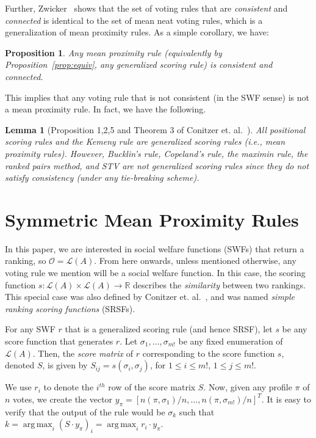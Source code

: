 \documentclass[10pt,letterpaper]{article}
\newcommand{\calL}{{\mathcal{L}}}
\newcommand{\rank}{{\calL(A)}}
\newcommand{\calO}{{\mathcal{O}}}
\DeclareMathOperator*{\argmax}{arg\,max}
\newtheorem{lemma}{Lemma}
\newtheorem{proposition}{Proposition}
\newenvironment{definition}[1][Definition]{\begin{trivlist}
\item[\hskip \labelsep {\bfseries #1}]}{\end{trivlist}}
\begin{document}
Further, Zwicker~\cite{Zwicker08b} shows that the set of voting rules that are \emph{consistent} and \emph{connected} is identical to the set of mean neat voting rules, which is a generalization of mean proximity rules. As a simple corollary, we have: 

\begin{proposition}
Any mean proximity rule (equivalently by Proposition~\ref{prop:equiv}, any generalized scoring rule) is consistent and connected.
\end{proposition}

This implies that any voting rule that is not consistent (in the SWF sense) is not a mean proximity rule. In fact, we have the following.

\begin{lemma}[Proposition 1,2,5 and Theorem 3 of Conitzer et. al.~\cite{CRX09}]
All positional scoring rules and the Kemeny rule are generalized scoring rules (i.e., mean proximity rules). However, Bucklin's rule, Copeland's rule, the maximin rule, the ranked pairs method, and STV are not generalized scoring rules since they do not satisfy consistency (under any tie-breaking scheme). 
\end{lemma}

\section{Symmetric Mean Proximity Rules}

In this paper, we are interested in social welfare functions (SWFs) that return a ranking, so $\calO = \rank$. From here onwards, unless mentioned otherwise, any voting rule we mention will be a social welfare function. In this case, the scoring function $s : \rank \times \rank \rightarrow \mathbb{R}$ describes the \emph{similarity} between two rankings. This special case was also defined by Conitzer et. al.~\cite{CRX09}, and was named \emph{simple ranking scoring functions} (SRSFs). 

\begin{definition}[Score Matrix]
For any SWF $r$ that is a generalized scoring rule (and hence SRSF), let $s$ be any score function that generates $r$. Let $\sigma_1,\ldots,\sigma_{m!}$ be any fixed enumeration of $\rank$. Then, the \emph{score matrix} of $r$ corresponding to the score function $s$, denoted $S$, is given by $S_{ij} = s(\sigma_i,\sigma_j)$, for $1 \le i \le m!$, $1 \le j \le m!$. 
\end{definition}

We use $r_i$ to denote the $i^{th}$ row of the score matrix $S$. Now, given any profile $\pi$ of $n$ votes, we create the vector $y_{\pi} = [n(\pi,\sigma_1)/n,\ldots,n(\pi,\sigma_{m!})/n]^T$. It is easy to verify that the output of the rule would be $\sigma_k$ such that $k = \argmax_i (S\cdot y_{\pi})_i = \argmax_i r_i \cdot y_{\pi}$. 
\end{document}
